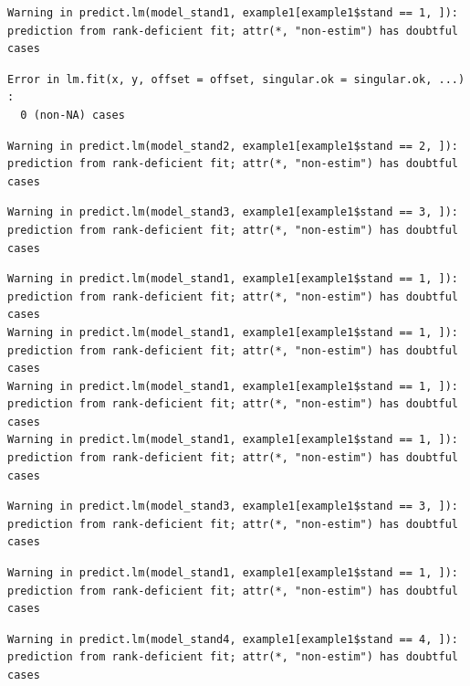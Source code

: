 \documentclass[
  letterpaper,
  DIV=11,
  numbers=noendperiod]{scrartcl}
\begin{document}
\begin{verbatim}
Warning in predict.lm(model_stand1, example1[example1$stand == 1, ]):
prediction from rank-deficient fit; attr(*, "non-estim") has doubtful cases
\end{verbatim}

\begin{verbatim}
Error in lm.fit(x, y, offset = offset, singular.ok = singular.ok, ...) : 
  0 (non-NA) cases
\end{verbatim}

\begin{verbatim}
Warning in predict.lm(model_stand2, example1[example1$stand == 2, ]):
prediction from rank-deficient fit; attr(*, "non-estim") has doubtful cases
\end{verbatim}

\begin{verbatim}
Warning in predict.lm(model_stand3, example1[example1$stand == 3, ]):
prediction from rank-deficient fit; attr(*, "non-estim") has doubtful cases
\end{verbatim}

\begin{verbatim}
Warning in predict.lm(model_stand1, example1[example1$stand == 1, ]):
prediction from rank-deficient fit; attr(*, "non-estim") has doubtful cases
Warning in predict.lm(model_stand1, example1[example1$stand == 1, ]):
prediction from rank-deficient fit; attr(*, "non-estim") has doubtful cases
Warning in predict.lm(model_stand1, example1[example1$stand == 1, ]):
prediction from rank-deficient fit; attr(*, "non-estim") has doubtful cases
Warning in predict.lm(model_stand1, example1[example1$stand == 1, ]):
prediction from rank-deficient fit; attr(*, "non-estim") has doubtful cases
\end{verbatim}

\begin{verbatim}
Warning in predict.lm(model_stand3, example1[example1$stand == 3, ]):
prediction from rank-deficient fit; attr(*, "non-estim") has doubtful cases
\end{verbatim}

\begin{verbatim}
Warning in predict.lm(model_stand1, example1[example1$stand == 1, ]):
prediction from rank-deficient fit; attr(*, "non-estim") has doubtful cases
\end{verbatim}

\begin{verbatim}
Warning in predict.lm(model_stand4, example1[example1$stand == 4, ]):
prediction from rank-deficient fit; attr(*, "non-estim") has doubtful cases
\end{verbatim}
\end{document}
